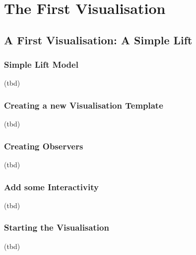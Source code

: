 \section{The First Visualisation}
\label{tutorial_03}

\subsection{A First Visualisation: A Simple Lift}


\subsubsection{Simple Lift Model}

(tbd)

\subsubsection{Creating a new Visualisation Template}

(tbd)

\subsubsection{Creating Observers}

(tbd)

\subsubsection{Add some Interactivity}

(tbd)

\subsubsection{Starting the Visualisation}

(tbd)
